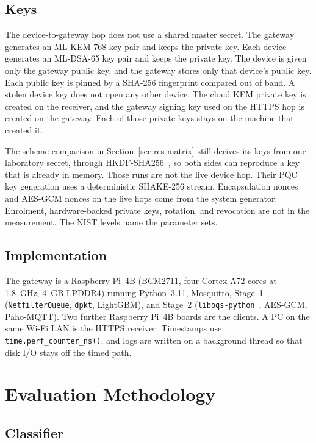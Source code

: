 \documentclass[journal]{IEEEtran}
\begin{document}
\subsection{Keys}
\label{sec:keys}

The device-to-gateway hop does not use a shared master secret. The gateway generates an ML-KEM-768 key pair and keeps the private key. Each device generates an ML-DSA-65 key pair and keeps the private key. The device is given only the gateway public key, and the gateway stores only that device's public key. Each public key is pinned by a SHA-256 fingerprint compared out of band. A stolen device key does not open any other device. The cloud KEM private key is created on the receiver, and the gateway signing key used on the HTTPS hop is created on the gateway. Each of those private keys stays on the machine that created it.

The scheme comparison in Section~\ref{sec:res-matrix} still derives its keys from one laboratory secret, through HKDF-SHA256~\cite{rfc5869}, so both sides can reproduce a key that is already in memory. Those runs are not the live device hop. Their PQC key generation uses a deterministic SHAKE-256 stream. Encapsulation nonces and AES-GCM nonces on the live hops come from the system generator. Enrolment, hardware-backed private keys, rotation, and revocation are not in the measurement. The NIST levels name the parameter sets.

\subsection{Implementation}

The gateway is a Raspberry Pi~4B (BCM2711, four Cortex-A72 cores at 1.8~GHz, 4~GB LPDDR4) running Python~3.11, Mosquitto, Stage~1 (\texttt{NetfilterQueue}, \texttt{dpkt}, LightGBM), and Stage~2 (\texttt{liboqs-python}~\cite{oqs2023}, AES-GCM, Paho-MQTT). Two further Raspberry Pi~4B boards are the clients. A PC on the same Wi-Fi LAN is the HTTPS receiver. Timestamps use \texttt{time.perf\_counter\_ns()}, and logs are written on a background thread so that disk I/O stays off the timed path.

\section{Evaluation Methodology}
\label{sec:method}

\subsection{Classifier}
\label{sec:training}
\end{document}
